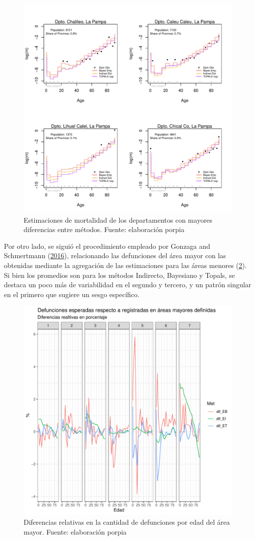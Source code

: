 \documentclass[12pt,]{article}
\begin{document}
\begin{figure}

{\centering \includegraphics[width=0.7\linewidth]{plots/AjusteFeos} 

}

\caption{Estimaciones de mortalidad de los departamentos con mayores diferencias entre métodos. Fuente: elaboración porpia}\label{fig:Feos}
\end{figure}

Por otro lado, se siguió el procedimiento empleado por Gonzaga and
Schmertmann (\protect\hyperlink{ref-Gonzaga_Schmertmann_2016}{2016}),
relacionando las defunciones del área mayor con las obtenidas mediante
la agregación de las estimaciones para las áreas menores
(\ref{fig:consistAM}). Si bien los promedios son para los métodos
Indirecto, Bayesiano y Topals, se destaca un poco más de variabilidad en
el segundo y tercero, y un patrón singular en el primero que sugiere un
sesgo específico.

\begin{figure}

{\centering \includegraphics[width=0.7\linewidth]{plots/ConsistAM} 

}

\caption{Diferencias relativas en la cantidad de defunciones por edad del área mayor. Fuente: elaboración porpia}\label{fig:consistAM}
\end{figure}
\end{document}
